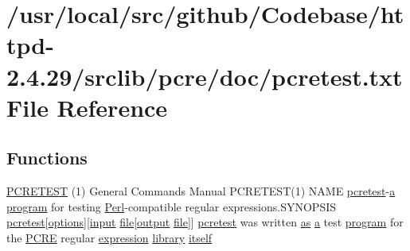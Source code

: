 \hypertarget{pcretest_8txt}{}\section{/usr/local/src/github/\+Codebase/httpd-\/2.4.29/srclib/pcre/doc/pcretest.txt File Reference}
\label{pcretest_8txt}
\subsection*{Functions}
\begin{DoxyCompactItemize}
\item 
\hyperlink{pcretest_8txt_a8703ca4ed0dc5c662a10deb1fa3dee90}{P\+C\+R\+E\+T\+E\+ST} (1) General Commands Manual P\+C\+R\+E\+T\+E\+ST(1) N\+A\+ME \hyperlink{pcregrep_8txt_a484396302564f57b7646cfd198092762}{pcretest}-\/\hyperlink{pcre_8txt_a841271aab70f5cda9412a19c7753f02c}{a} \hyperlink{pcretest_8txt_a48917cf15a1089461e55bc56de9a58c3}{program} for testing \hyperlink{pcre_8txt_ab4ce39be83e35c074153e23755e6b420}{Perl}-\/compatible regular expressions.\+S\+Y\+N\+O\+P\+S\+IS \hyperlink{pcregrep_8txt_a484396302564f57b7646cfd198092762}{pcretest}\mbox{[}\hyperlink{pcre_8txt_aefb1fa742c21909e746b978f6e1d7e17}{options}\mbox{]}\mbox{[}\hyperlink{perltest_8txt_a1d3f4df61ab6d72e9cfd2de361e2a85b}{input} \hyperlink{pcregrep_8txt_ac062b5382a17ef4e936c49bdd74c5563}{file}\mbox{[}\hyperlink{pcretest_8txt_acf47d950a4853a501d6b975b394de5e5}{output} \hyperlink{pcregrep_8txt_ac062b5382a17ef4e936c49bdd74c5563}{file}\mbox{]}\mbox{]} \hyperlink{pcregrep_8txt_a484396302564f57b7646cfd198092762}{pcretest} was written \hyperlink{pcretest_8txt_a7681723cb91eaa99771ee87f8465c1aa}{as} \hyperlink{pcre_8txt_a841271aab70f5cda9412a19c7753f02c}{a} test \hyperlink{pcretest_8txt_a48917cf15a1089461e55bc56de9a58c3}{program} for the \hyperlink{pcre_8txt_a970782a5ef22596881e664deb789f171}{P\+C\+RE} regular \hyperlink{pcregrep_8txt_a05ebca6485a470f925576189fae31ebf}{expression} \hyperlink{pcretest_8txt_a7d2e848fb4392b4e74cbf478dbdc6ad1}{library} \hyperlink{pcretest_8txt_ab60095063ff50c16f555d29d809e03b5}{itself}
\item 

\end{DoxyCompactItemize}
